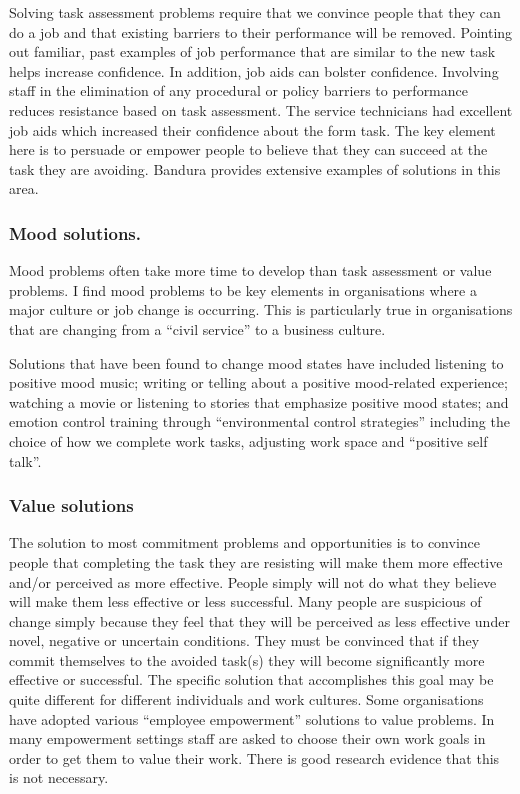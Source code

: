 Solving task assessment problems require that we convince people that they can do a job and that existing barriers to their performance will be removed. Pointing out familiar, past examples of job performance that are similar to the new task helps increase confidence. In addition, job aids can bolster confidence. Involving staff in the elimination of any procedural or policy barriers to performance reduces resistance based on task assessment. The service technicians had excellent job aids which increased their confidence about the form task. The key element here is to persuade or empower people to believe that they can succeed at the task they are avoiding. Bandura provides extensive examples of solutions in this area.

\subsubsection{Mood solutions.}

Mood problems often take more time to develop than task assessment or value problems. I find mood problems to be key elements in organisations where a major culture or job change is occurring. This is particularly true in organisations that are changing from a “civil service” to a business culture.

Solutions that have been found to change mood states have included listening to positive mood music; writing or telling about a positive mood-related experience; watching a movie or listening to stories that emphasize positive mood states; and emotion control training through ``environmental control strategies'' including the choice of how we complete work tasks, adjusting work space and ``positive self talk''.

\subsubsection{Value solutions}

The solution to most commitment problems and opportunities is to convince people that completing the task they are resisting will make them more effective and/or perceived as more effective. People simply will not do what they believe will make them less effective or less successful. Many people are suspicious of change simply because they feel that they will be perceived as less effective under novel, negative or uncertain conditions. They must be convinced that if they commit themselves to the avoided task(s) they will become significantly more effective or successful. The specific solution that accomplishes this goal may be quite different for different individuals and work cultures. Some organisations have adopted various ``employee empowerment'' solutions to value problems. In many empowerment settings staff are asked to choose their own work goals in order to get them to value their work. There is good research evidence that this is not necessary.

